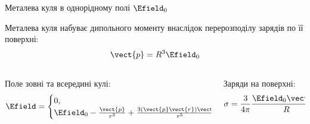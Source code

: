 \documentclass[onlytextwidth]{beamer}
\begin{document}
\begin{frame}{Металева куля в однорідному полі $\Efield_0$}{}
	\begin{center}
		
	\end{center}
	\begin{block}{}\justifying
		Металева куля набуває дипольного моменту внаслідок 	перерозподілу зарядів по її поверхні:
		\begin{equation*}
			\vect{p} = R^3\Efield_0
		\end{equation*}
	\end{block}
\begin{columns}
	\begin{column}{0.5\linewidth}
	\begin{block}{}\centering
		Поле зовні та всередині кулі:
\begin{equation*}
    			\Efield =
			\begin{cases}
				0,
				        & r \le R \\
				\Efield_0 - \frac{\vect{p}}{r^3} + \frac{3\left(\vect{p}\vect{r}\right)\vect{r}
				}{r^5}, & r > R,
			\end{cases}
\end{equation*}
	\end{block}
	\end{column}
	\begin{column}{0.5\linewidth}
	\begin{block}{}\centering
		Заряди на поверхні:
        \begin{equation*}
     			\sigma = \frac{3}{4\pi} \frac{\Efield_0\vect{r}}{R}.
        \end{equation*}
	\end{block}
	\end{column}
\end{columns}

\end{frame}
\end{document}

